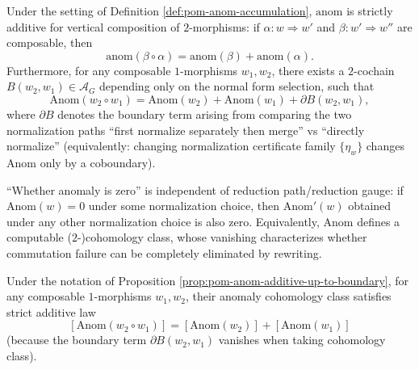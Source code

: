 \begin{proposition}\label{prop:pom-anom-additive-up-to-boundary}
Under the setting of Definition \ref{def:pom-anom-accumulation}, \(\mathrm{anom}\) is strictly additive for vertical composition of \(2\)-morphisms: if \(\alpha:w\Rightarrow w'\) and \(\beta:w'\Rightarrow w''\) are composable, then
\[
\mathrm{anom}(\beta\circ\alpha)=\mathrm{anom}(\beta)+\mathrm{anom}(\alpha).
\]
Furthermore, for any composable \(1\)-morphisms \(w_1,w_2\), there exists a \(2\)-cochain \(B(w_2,w_1)\in\mathcal{A}_G\) depending only on the normal form selection, such that
\[
\mathrm{Anom}(w_2\circ w_1)
=
\mathrm{Anom}(w_2)+\mathrm{Anom}(w_1)+\partial B(w_2,w_1),
\]
where \(\partial B\) denotes the boundary term arising from comparing the two normalization paths ``first normalize separately then merge'' vs ``directly normalize'' (equivalently: changing normalization certificate family \(\{\eta_w\}\) changes \(\mathrm{Anom}\) only by a coboundary).
\end{proposition}

\begin{corollary}\label{cor:pom-anom-cohomology-class}
``Whether anomaly is zero'' is independent of reduction path/reduction gauge: if \(\mathrm{Anom}(w)=0\) under some normalization choice, then \(\mathrm{Anom}'(w)\) obtained under any other normalization choice is also zero.
Equivalently, \(\mathrm{Anom}\) defines a computable (\(2\)-)cohomology class, whose vanishing characterizes whether commutation failure can be completely eliminated by rewriting.
\end{corollary}

\begin{corollary}\label{cor:pom-anom-class-additive}
Under the notation of Proposition \ref{prop:pom-anom-additive-up-to-boundary}, for any composable \(1\)-morphisms \(w_1,w_2\), their anomaly cohomology class satisfies strict additive law
\[
\boxed{\;
[\mathrm{Anom}(w_2\circ w_1)]
=
[\mathrm{Anom}(w_2)]
+
[\mathrm{Anom}(w_1)]\;}
\]
(because the boundary term \(\partial B(w_2,w_1)\) vanishes when taking cohomology class).
\end{corollary}

